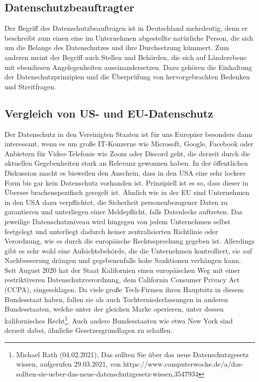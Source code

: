 \subsection{Datenschutzbeauftragter}
    Der Begriff des Datenschutzbeauftragen ist in Deutschland mehrdeutig, denn er beschreibt zum einen eine im Unternehmen abgestellte natürliche Person, die sich um die Belange des Datenschutzes und ihre Durchsetzung kümmert. Zum anderen meint der Begriff auch Stellen und Behörden, die sich auf Länderebene mit ebendiesen Angelegenheiten auseinandersetzen. Dazu gehören die Einhaltung der Datenschutzprinzipien und die Überprüfung von hervorgebrachten Bedenken und Streitfragen.

\subsection{Vergleich von US- und EU-Datenschutz}
    Der Datenschutz in den Vereinigten Staaten ist für uns Europäer besonders dann interessant, wenn es um große IT-Konzerne wie Microsoft, Google, Facebook oder Anbietern für Video-Telefonie wie Zoom oder Discord geht, die derzeit durch die aktuellen Gegebenheiten stark an Relevanz gewonnen haben. In der öffentlichen Diskussion macht es bisweilen den Anschein, dass in den USA eine sehr lockere Form bis gar kein Datenschutz vorhanden ist. Prinzipiell ist es so, dass dieser in Übersee brachenspezifisch geregelt ist. Ähnlich wie in der EU sind Unternehmen in den USA dazu verpflichtet, die Sicherheit personenbezogener Daten zu garantieren und unterliegen einer Meldepflicht, falls Datenlecks auftreten. Das jeweilige Datenschutzniveau wird hingegen von jedem Unternehmen selbst festgelegt und unterliegt dadurch keiner zentralisierten Richtlinie oder Verordnung, wie es durch die europäische Rechtssprechung gegeben ist. Allerdings gibt es sehr wohl eine Aufsichtsbehörde, die die Unternehmen kontrolliert, sie auf Nachbesserung drängen und gegebenenfalls hohe Sanktionen verhängen kann.\\
    Seit August 2020 hat der Staat Kalifornien einen \glqq europäischen Weg\grqq{} mit einer restriktiveren Datenschutzverordnung, dem California Consumer Privacy Act (CCPA), eingeschlagen. Da viele große Tech-Firmen ihren Hauptsitz in diesem Bundesstaat haben, fallen sie als auch Tochterniederlassungen in anderen Bundesstaaten, welche unter der gleichen Marke operieren, unter dessen kalifornisches Recht\footnote{Michael Rath (04.02.2021), Das sollten Sie über das neue Datenschutzgesetz wissen, aufgerufen 29.03.2021, von https://www.computerwoche.de/a/das-sollten-sie-ueber-das-neue-datenschutzgesetz-wissen,3547934}. Auch andere Bundesstaaten wie etwa New York sind derzeit dabei, ähnliche Gesetzesgrundlagen zu schaffen.\\
